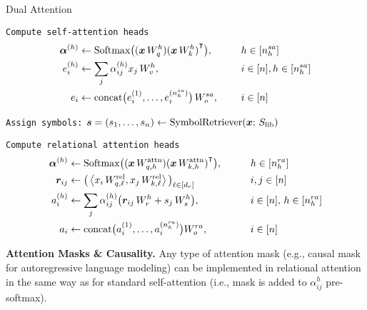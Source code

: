 \begin{algorithm}[ht!]
	\caption{Dual Attention}\label{alg:dual_head_attn}

    \vspace{1em}

    \texttt{Compute self-attention heads}
    \begin{align*}
        \bm{\alpha}^{(h)} &\gets \mathrm{Softmax}\big({(\bm{x} \, W_q^h)} {(\bm{x} \, W_k^h)}^\intercal\big), \qquad && h \in [n_h^{sa}] \\
        e_i^{(h)} &\gets \sum_{j} \alpha_{ij}^{(h)} x_j \, W_v^h, \qquad && i \in [n], h \in [n_h^{sa}]\\
        e_i &\gets \mathrm{concat}\big(e_i^{(1)}, \ldots, e_i^{(n_h^{sa})}\big) \, W_o^{sa}, && i \in [n]
    \end{align*}

    \texttt{Assign symbols:} $\bm{s} = (s_1, \ldots, s_n) \gets \mathrm{SymbolRetriever}(\bm{x};\,S_\mathrm{lib})$

    \texttt{Compute relational attention heads}
    \begin{align*}
        \bm{\alpha}^{(h)} &\gets \mathrm{Softmax}\big({(\bm{x} \, W_{q, h}^{\mathrm{attn}})} {(\bm{x} \, W_{k, h}^{\mathrm{attn}})}^\intercal\big), \qquad && h \in [n_h^{ra}] \\
        \bm{r}_{ij} &\gets \big(\left \langle x_i \, W_{q, \ell}^{\mathrm{rel}}, x_j \, W_{k, \ell}^{\mathrm{rel}} \right\rangle\big)_{\ell \in [d_r]} \qquad && i,j \in [n] \\
        a_i^{(h)} &\gets \sum_{j} \alpha_{ij}^{(h)} \big(\bm{r}_{ij}\,W_r^h + s_j \, W_s^{h}\big), \qquad && i \in [n],\, h \in [n_h^{ra}]\\
        a_i &\gets \mathrm{concat}\big(a_i^{(1)}, \ldots, a_i^{(n_h^{ra})}\big) W_o^{ra}, && i \in [n]
    \end{align*}


\end{algorithm}

\textbf{Attention Masks \& Causality.} Any type of attention mask (e.g., causal mask for autoregressive language modeling) can be implemented in relational attention in the same way as for standard self-attention (i.e., mask is added to $\alpha_{ij}^h$ pre-softmax).

